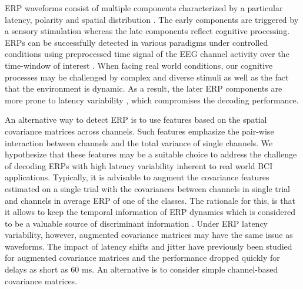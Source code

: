 \documentclass[12pt]{iopart}
\begin{document}


ERP waveforms consist of multiple components characterized
by a particular latency, polarity and spatial distribution \cite{duncan_event-related_2009}.
The early components are triggered by a sensory stimulation
whereas the late components reflect cognitive processing.
ERPs can be successfully detected in various paradigms under controlled conditions
using preprocessed time signal of the EEG channel activity over the time-window of interest \cite{blankertz_single-trial_2011}.
When facing real world conditions, our cognitive processes may be challenged
by complex and diverse stimuli 
as well as the fact that the environment is dynamic.
As a result, the later ERP components are more prone to latency variability \cite{arico_evaluation_2013},
which compromises the decoding performance.


An alternative way to detect ERP is to use features based on the spatial covariance matrices across channels. Such
features emphasize the pair-wise interaction
between channels and the total variance of single channels.
We hypothesize that these features may be a suitable choice
to address the challenge of decoding ERPs with high latency variability 
inherent to real world BCI applications.
Typically, it is advisable to augment the covariance features estimated
on a single trial with the covariances between channels
in single trial and channels in average ERP
of one of the classes. The rationale for this, is that it allows to keep the temporal information 
of ERP dynamics which is considered to be
a valuable source of discriminant information \cite{congedo_new_2013,barachant_plug&play_2014}.
Under ERP latency variability, however, 
augmented covariance matrices may have the same issue as
waveforms.
The impact of latency shifts and jitter have previously been studied
for augmented covariance matrices \cite{barachant_plug&play_2014}
and the performance dropped quickly for delays as short as 60 ms.
An alternative is to consider simple channel-based covariance matrices.
\end{document}

